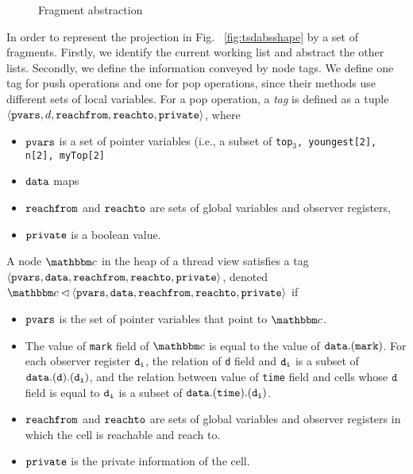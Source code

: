 \begin{figure}
	
\caption{Fragment abstraction}
\label{fig:tsviewshape}
\end{figure} 
In order to represent the projection in Fig. ~\ref{fig:tsdabsshape} by
a set of fragments. Firstly, we identify the current working list and abstract the other lists. Secondly, we define the information conveyed by node tags.
We define one tag for push operations and one for pop operations, since
their methods use different sets of local variables.
For a pop operation, a {\em tag} is defined as a tuple
$\left\langle\mathtt{pvars},d,\mathtt{reachfrom},\mathtt{reachto},\mathtt{private}\right\rangle$, where
\begin{itemize}
\item
  $\mathtt{pvars}$ is a set of pointer variables (i.e., a subset of
  {\tt top$_3$, youngest[2], n[2], myTop[2]}
\item
  $\mathtt{data}$ maps
\item
  $\mathtt{reachfrom}$ and $\mathtt{reachto}$ are sets of global variables and observer registers, %
\item
  $\mathtt{private}$ is a boolean value.
\end{itemize}
A node $\cell$ in the heap of a thread view satisfies a tag $\left\langle\mathtt{pvars},\mathtt{data},\mathtt{reachfrom},\mathtt{reachto},\mathtt{private}\right\rangle$,
denoted $\cell \lhd \tagtuple$ if
\begin{itemize}
\item
  $\mathtt{pvars}$ is the set of pointer variables that point to $\cell$.
\item
The value of {\tt mark} field of $\cell$ is equal to the value of $\mathtt{data}\tt {.(mark)}$. For each observer register $\tt d_i$, the relation of {\tt d} field  and $\tt d_i$ is a subset of $\mathtt{data}\tt {.(d).(d_i)}$, and the relation between value of {\tt time} field and cells whose $\tt d$ field is equal to $\tt d_i$ is a subset of $\mathtt{data}\tt {.(time).(d_i)}$. 
\item $\mathtt{reachfrom}$ and $\mathtt{reachto}$ are sets of global variables and observer registers in which the cell is reachable and reach to.
\item $\mathtt{private}$ is the private information of the cell.
\end{itemize}

